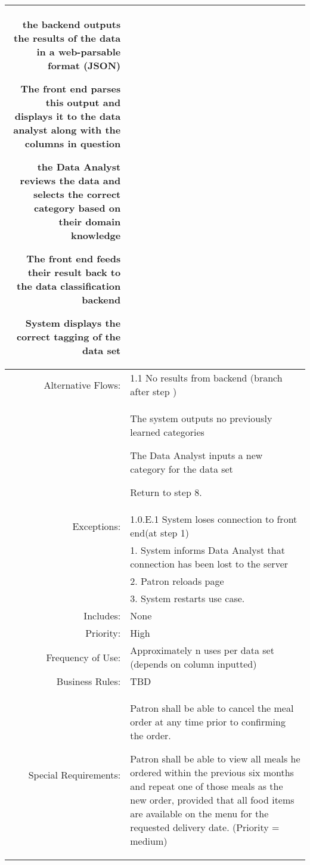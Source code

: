 \documentclass[12pt,oneside,letterpaper]{article}
\newenvironment{packed_enumerate}{ %
\vspace{-7mm}
\begin{enumerate}
  \setlength{\itemsep}{0pt}
  \setlength{\parskip}{0pt}
  \setlength{\parsep}{0pt}
}{\end{enumerate}
\vspace{-8mm}}
\begin{document}
\begin{longtable}{|r|p{3.8in}|}
\begin{packed_enumerate}
\item the backend outputs the results of the data in a web-parsable format (JSON)
\item The front end parses this output and displays it to the data analyst along with the columns in question
\item the Data Analyst reviews the data and selects the correct category based on their domain knowledge
\item The front end feeds their result back to the data classification backend
\item System displays the correct tagging of the data set
\end{packed_enumerate}\\
\hline
Alternative Flows:&1.1 No results from backend (branch after step )\\
&  %
\begin{packed_enumerate}
\item The system outputs no previously learned categories
\item The Data Analyst inputs a new category for the data set
\item Return to step 8.
\end{packed_enumerate}\\
\hline
Exceptions:&1.0.E.1 System loses connection to front end(at step 1)\\
&1. 	System informs Data Analyst that connection has been lost to the server\\
&2.	Patron reloads page\\
&3.	System restarts use case.\\
\hline
Includes:&None\\
\hline
Priority:&High\\
\hline
Frequency of Use:&Approximately n uses per data set (depends on column inputted)\\
\hline
Business Rules:&TBD\\
\hline
Special Requirements:&
\begin{packed_enumerate}
\item Patron shall be able to cancel the meal order at any time prior to confirming the order.
\item Patron shall be able to view all meals he ordered within the previous six months and repeat one of those meals as the new order, provided that all food items are available on the menu for the requested delivery date. (Priority = medium)
\end{packed_enumerate}\\

\end{longtable}
\end{document}
